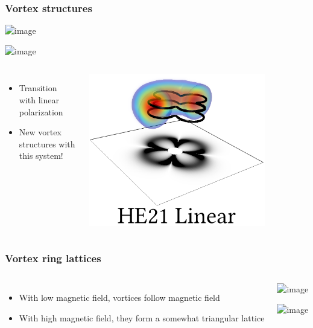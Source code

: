 \documentclass{beamer}
\begin{document}
\begin{frame}
\frametitle{Vortex structures}
\begin{center}
\includegraphics<1>[width=\textwidth]{vortex_transition_1.png}

\includegraphics<2->[width=\textwidth]{vortex_transition_2.png}
\end{center}
\begin{columns}
\begin{itemize}
\item Transition with linear polarization
\item New vortex structures with this system!
\end{itemize}
\center \includegraphics[width=0.8\textwidth]{HE21_3d.png}
\end{columns}
\end{frame}

\begin{frame}
\frametitle{Vortex ring lattices}

\begin{columns}
\begin{itemize}
\item With low magnetic field, vortices follow magnetic field
\item With high magnetic field, they form a somewhat triangular lattice
\end{itemize}
\begin{center}
\includegraphics<1>[width=\linewidth]{vortex_line_all_1.png}

\includegraphics<2->[width=\linewidth]{vortex_line_all_2.png}
\end{center}
\end{columns}
\end{frame}
\end{document}
